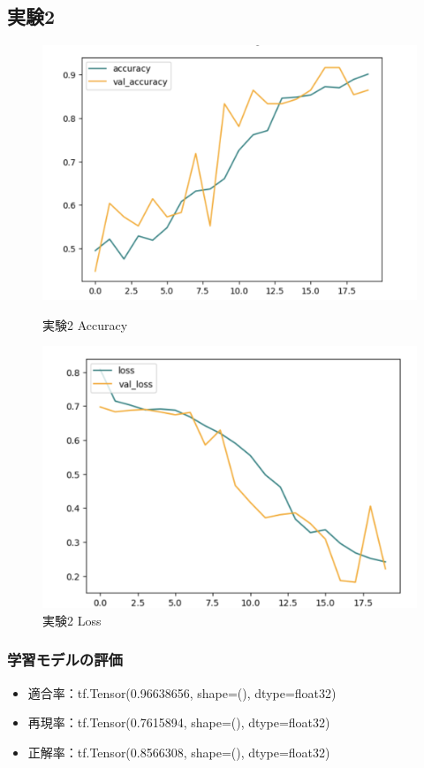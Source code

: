 \documentclass[a4paper, 11pt, titlepage]{jsarticle}
\begin{document}
\subsection{実験2}
\begin{figure}[htbp]
  \begin{minipage}[b]{0.45\linewidth}
    \centering
    \includegraphics[keepaspectratio, scale=0.33]{ex2_acc.png}
    \caption{実験2 Accuracy}
  \end{minipage}
  \begin{minipage}[b]{0.45\linewidth}
    \centering
    \includegraphics[keepaspectratio, scale=0.33]{ex2_loss.png}
    \caption{実験2 Loss}
  \end{minipage}
\end{figure}

\subsubsection{学習モデルの評価}
\begin{itemize}
\item 適合率：tf.Tensor(0.96638656, shape=(), dtype=float32)
\item 再現率：tf.Tensor(0.7615894, shape=(), dtype=float32) 
\item 正解率：tf.Tensor(0.8566308, shape=(), dtype=float32)
\end{itemize}
\end{document}
